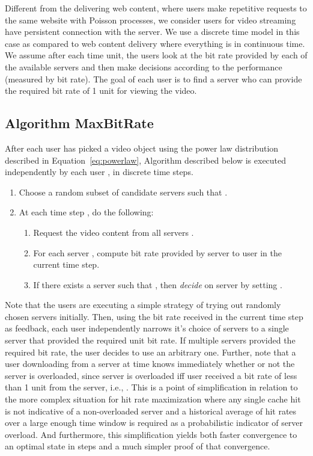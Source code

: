\documentclass[conference]{IEEEtran}
\begin{document}
Different from the delivering web content, where users make repetitive requests to the same website with Poisson processes, we consider users for video streaming have persistent connection with the server. We use a discrete time model in this case as compared to web content delivery where everything is in continuous time. We assume after each time unit, the users look at the bit rate provided by each of the available servers and then make decisions according to the performance (measured by bit rate).
The goal of each user is to find a server who can provide the required bit rate of 1 unit for viewing the video.

\subsection{Algorithm MaxBitRate}
After each user  has picked a video object  using the power law distribution described in Equation~\ref{eq:powerlaw}, Algorithm  described below is executed independently by each user , in discrete time steps.
\begin{enumerate}
\item Choose a random subset of candidate servers   such that .
\item At each time step , do the following:
\begin{enumerate}
\item Request the video content from all servers .
\item For each server  , compute   bit rate provided by server  to user  in the current time step.
\item If there exists a server  such that , then {\em decide} on server  by setting .
\end{enumerate}
\end{enumerate}
Note that the users are executing  a simple strategy of trying out  randomly chosen servers initially.  Then, using the bit rate received in the current time step as feedback, each user independently narrows it's choice of servers to a single server that provided the required unit bit rate. 
If multiple servers provided the required bit rate,  the user decides to use an arbitrary one. Further, note that a user   downloading from a server  at time   knows  immediately whether or not the server is overloaded, since server  is overloaded iff user  received a bit rate of less than 1 unit from the server, i.e., . This is a point of simplification in relation to the more complex situation for hit rate maximization where any single cache hit is not indicative of a non-overloaded server and a historical average of hit rates over a large enough time window  is required as a probabilistic indicator of server overload. And furthermore, this simplification yields both faster convergence to an optimal state in  steps and a much simpler proof of that convergence.
\end{document}
